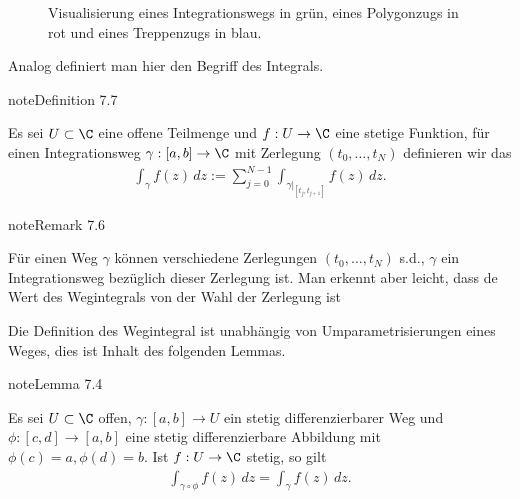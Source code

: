 \documentclass[letterpaper,10pt,german]{jupyterBook}
\let\sphinxpxdimen\pdfpxdimen\else\newdimen\sphinxpxdimen
\begin{document}
\begin{figure}[htbp]
\centering
\capstart

\noindent\sphinxincludegraphics[height=300\sphinxpxdimen]{{treppenzug}.jpg}
\caption{Visualisierung eines Integrationswegs in grün, eines Polygonzugs in rot und eines Treppenzugs in blau.}\label{\detokenize{complexanalysis/kurvenintegrale:fig-treppenzug}}\end{figure}

\sphinxAtStartPar
Analog definiert man hier den Begriff des Integrals.
\label{complexanalysis/kurvenintegrale:definition-7}
\begin{sphinxadmonition}{note}{Definition 7.7}



\sphinxAtStartPar
Es sei \(U\subset\C\) eine offene Teilmenge und \(f:U\to\C\) eine stetige Funktion, für einen Integrationsweg \(\gamma:[a,b]\to\C\) mit Zerlegung \((t_0,\ldots,t_N)\)  definieren wir das 
\begin{equation*}
\begin{split}\int_\gamma f(z)\, dz:= \sum_{j=0}^{N-1} \int_{\gamma\rvert_{[t_j,t_{j+1}]}} f(z)\,dz.\end{split}
\end{equation*}\end{sphinxadmonition}
\label{complexanalysis/kurvenintegrale:remark-8}
\begin{sphinxadmonition}{note}{Remark 7.6}



\sphinxAtStartPar
Für einen Weg \(\gamma\) können verschiedene Zerlegungen \((t_0,\ldots,t_N)\) s.d., \(\gamma\) ein Integrationsweg bezüglich dieser Zerlegung ist. Man erkennt aber leicht, dass de Wert des Wegintegrals  von der Wahl der Zerlegung ist
\end{sphinxadmonition}

\sphinxAtStartPar
Die Definition des Wegintegral ist unabhängig von Umparametrisierungen eines Weges, dies ist Inhalt des folgenden Lemmas.
\label{complexanalysis/kurvenintegrale:lemma-9}
\begin{sphinxadmonition}{note}{Lemma 7.4}



\sphinxAtStartPar
Es sei \(U\subset\C\) offen, \(\gamma:[a,b]\to U\) ein stetig differenzierbarer Weg und \(\phi:[c,d]\to[a,b]\) eine stetig differenzierbare Abbildung mit \(\phi(c)=a,\phi(d)=b\). Ist \(f:U\to\C\) stetig, so gilt
\begin{equation*}
\begin{split}\int_{\gamma\circ\phi} f(z)\, dz = \int_\gamma f(z)\, dz.\end{split}
\end{equation*}\end{sphinxadmonition}
\end{document}
